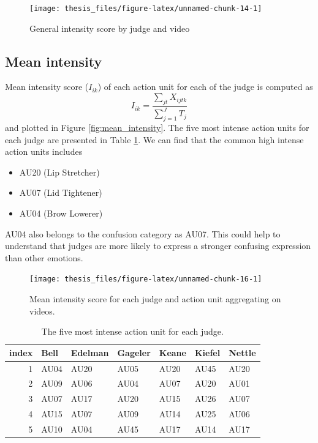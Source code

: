\documentclass{monashthesis}
\begin{document}
\begin{figure}
\texttt{[image: thesis\_files/figure-latex/unnamed-chunk-14-1]} \caption{General intensity score by judge and video\label{fig:intensity}}\label{fig:unnamed-chunk-14}
\end{figure}

\hypertarget{mean-intensity}{%
\subsection{Mean intensity}\label{mean-intensity}}

Mean intensity score (\(I_{ik}\)) of each action unit for each of the judge is computed as \[I_{ik} = \frac{\sum_{jt}X_{ijtk}}{\sum_{j = 1}^JT_j}\] and plotted in Figure \ref{fig:mean_intensity}. The five most intense action units for each judge are presented in Table \ref{tab:most_intense}. We can find that the common high intense action units includes

\begin{itemize}
\tightlist
\item
  AU20 (Lip Stretcher)
\item
  AU07 (Lid Tightener)
\item
  AU04 (Brow Lowerer)
\end{itemize}

AU04 also belongs to the confusion category as AU07. This could help to understand that judges are more likely to express a stronger confusing expression than other emotions.

\begin{figure}
\texttt{[image: thesis\_files/figure-latex/unnamed-chunk-16-1]} \caption{Mean intensity score for each judge and action unit aggregating on videos.\label{fig:mean_intensity}}\label{fig:unnamed-chunk-16}
\end{figure}

\begin{table}[t]

\caption{\label{tab:unnamed-chunk-17}\label{tab:most_intense}The five most intense action unit for each judge.}
\centering
\begin{tabular}{r|l|l|l|l|l|l}
\hline
index & Bell & Edelman & Gageler & Keane & Kiefel & Nettle\\
\hline
1 & AU04 & AU20 & AU05 & AU20 & AU45 & AU20\\
\hline
2 & AU09 & AU06 & AU04 & AU07 & AU20 & AU01\\
\hline
3 & AU07 & AU17 & AU20 & AU15 & AU26 & AU07\\
\hline
4 & AU15 & AU07 & AU09 & AU14 & AU25 & AU06\\
\hline
5 & AU10 & AU04 & AU45 & AU17 & AU14 & AU17\\
\hline
\end{tabular}
\end{table}
\end{document}
